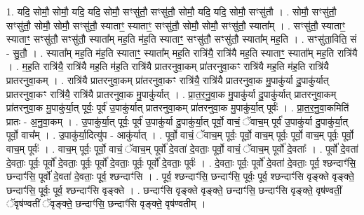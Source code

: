 \documentclass[17pt]{extarticle}
\begin{document}
1. यदि॒ सोमौ॒ सोमौ॒ यदि॒ यदि॒ सोमौ॒ सꣳसु॑तौ॒ सꣳसु॑तौ॒ सोमौ॒ यदि॒ यदि॒ सोमौ॒ सꣳसु॑तौ । . सोमौ॒ सꣳसु॑तौ॒ सꣳसु॑तौ॒ सोमौ॒ सोमौ॒ सꣳसु॑तौ॒ स्याताꣳ॒॒ स्याताꣳ॒॒ सꣳसु॑तौ॒ सोमौ॒ सोमौ॒ सꣳसु॑तौ॒ स्याता᳚म् । . सꣳसु॑तौ॒ स्याताꣳ॒॒ स्याताꣳ॒॒ सꣳसु॑तौ॒ सꣳसु॑तौ॒ स्याता᳚म् मह॒ति म॑ह॒ति स्याताꣳ॒॒ सꣳसु॑तौ॒ सꣳसु॑तौ॒ स्याता᳚म् मह॒ति । . सꣳसु॑ता॒विति॒ सं - सु॒तौ॒ । . स्याता᳚म् मह॒ति म॑ह॒ति स्याताꣳ॒॒ स्याता᳚म् मह॒ति रात्रि॑यै॒ रात्रि॑यै मह॒ति स्याताꣳ॒॒ स्याता᳚म् मह॒ति रात्रि॑यै । . म॒ह॒ति रात्रि॑यै॒ रात्रि॑यै मह॒ति म॑ह॒ति रात्रि॑यै प्रातरनुवा॒कम् प्रा॑तरनुवा॒कꣳ रात्रि॑यै मह॒ति म॑ह॒ति रात्रि॑यै प्रातरनुवा॒कम् । . रात्रि॑यै प्रातरनुवा॒कम् प्रा॑तरनुवा॒कꣳ रात्रि॑यै॒ रात्रि॑यै प्रातरनुवा॒क मु॒पाकु॑र्या दु॒पाकु॑र्यात् प्रातरनुवा॒कꣳ रात्रि॑यै॒ रात्रि॑यै प्रातरनुवा॒क मु॒पाकु॑र्यात् । . प्रा॒त॒र॒नु॒वा॒क मु॒पाकु॑र्या दु॒पाकु॑र्यात् प्रातरनुवा॒कम् प्रा॑तरनुवा॒क मु॒पाकु॑र्या॒त् पूर्वः॒ पूर्व॑ उ॒पाकु॑र्यात् प्रातरनुवा॒कम् प्रा॑तरनुवा॒क मु॒पाकु॑र्या॒त् पूर्वः॑ । . प्रा॒त॒र॒नु॒वा॒कमिति॑ प्रातः - अ॒नु॒वा॒कम् । . उ॒पाकु॑र्या॒त् पूर्वः॒ पूर्व॑ उ॒पाकु॑र्या दु॒पाकु॑र्या॒त् पूर्वो॒ वाचं॒ ॅवाच॒म् पूर्व॑ उ॒पाकु॑र्या दु॒पाकु॑र्या॒त् पूर्वो॒ वाच᳚म् । . उ॒पाकु॑र्या॒दित्यु॑प - आकु॑र्यात् । . पूर्वो॒ वाचं॒ ॅवाच॒म् पूर्वः॒ पूर्वो॒ वाच॒म् पूर्वः॒ पूर्वो॒ वाच॒म् पूर्वः॒ पूर्वो॒ वाच॒म् पूर्वः॑ । . वाच॒म् पूर्वः॒ पूर्वो॒ वाचं॒ ॅवाच॒म् पूर्वो॑ दे॒वता॑ दे॒वताः॒ पूर्वो॒ वाचं॒ ॅवाच॒म् पूर्वो॑ दे॒वताः᳚ । . पूर्वो॑ दे॒वता॑ दे॒वताः॒ पूर्वः॒ पूर्वो॑ दे॒वताः॒ पूर्वः॒ पूर्वो॑ दे॒वताः॒ पूर्वः॒ पूर्वो॑ दे॒वताः॒ पूर्वः॑ । . दे॒वताः॒ पूर्वः॒ पूर्वो॑ दे॒वता॑ दे॒वताः॒ पूर्व॒ श्छन्दाꣳ॑सि॒ छन्दाꣳ॑सि॒ पूर्वो॑ दे॒वता॑ दे॒वताः॒ पूर्व॒ श्छन्दाꣳ॑सि । . पूर्व॒ श्छन्दाꣳ॑सि॒ छन्दाꣳ॑सि॒ पूर्वः॒ पूर्व॒ श्छन्दाꣳ॑सि वृङ्क्ते वृङ्क्ते॒ छन्दाꣳ॑सि॒ पूर्वः॒ पूर्व॒ श्छन्दाꣳ॑सि वृङ्क्ते । . छन्दाꣳ॑सि वृङ्क्ते वृङ्क्ते॒ छन्दाꣳ॑सि॒ छन्दाꣳ॑सि वृङ्क्ते॒ वृष॑ण्वतीं॒ ॅवृष॑ण्वतीं ॅवृङ्क्ते॒ छन्दाꣳ॑सि॒ छन्दाꣳ॑सि वृङ्क्ते॒ वृष॑ण्वतीम् । \newline
\end{document}
